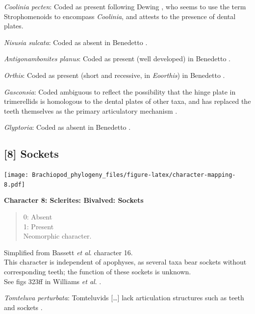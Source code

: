 \documentclass[openany]{book}
\theoremstyle{definition}
\theoremstyle{definition}
\theoremstyle{definition}
\theoremstyle{remark}
\begin{document}
\emph{Coolinia pecten}: Coded as present following Dewing
\citeyearpar{Dewing2001Hingemodifications}, who seems to use the term
Strophomenoids to encompass \emph{Coolinia}, and attests to the presence
of dental plates.

\emph{Nisusia sulcata}: Coded as absent in Benedetto
\citeyearpar{Benedetto2009iChaniella}.

\emph{Antigonambonites planus}: Coded as present (well developed) in
Benedetto \citeyearpar{Benedetto2009iChaniella}.

\emph{Orthis}: Coded as present (short and recessive, in
\emph{Eoorthis}) in Benedetto \citeyearpar{Benedetto2009iChaniella}.

\emph{Gasconsia}: Coded ambiguous to reflect the possibility that the
hinge plate in trimerellids is homologous to the dental plates of other
taxa, and has replaced the teeth themselves as the primary articulatory
mechanism \citep[see][p.~184, for details of the
articulation]{Williams2000BrachiopodaLinguliformea}.

\emph{Glyptoria}: Coded as absent in Benedetto
\citeyearpar{Benedetto2009iChaniella}.

\hypertarget{sockets}{%
\subsection*{{[}8{]} Sockets}\label{sockets}}

\texttt{[image: Brachiopod\_phylogeny\_files/figure-latex/character-mapping-8.pdf]}

\textbf{Character 8: Sclerites: Bivalved: Sockets}

\begin{quote}
0: Absent\\
1: Present\\
Neomorphic character.
\end{quote}

Simplified from Bassett \emph{et al}.
\citeyearpar{Bassett2001Functionalmorphology} character 16.\\
This character is independent of apophyses, as several taxa bear sockets
without corresponding teeth; the function of these sockets is unknown.\\
See figs 323ff in Williams \emph{et al}.
\citeyearpar{Williams1997BrachiopodaRevised}.

\emph{Tomteluva perturbata}: Tomteluvids {[}\ldots{}{]} lack
articulation structures such as teeth and sockets
\citep{Streng2016Anew}.
\end{document}
